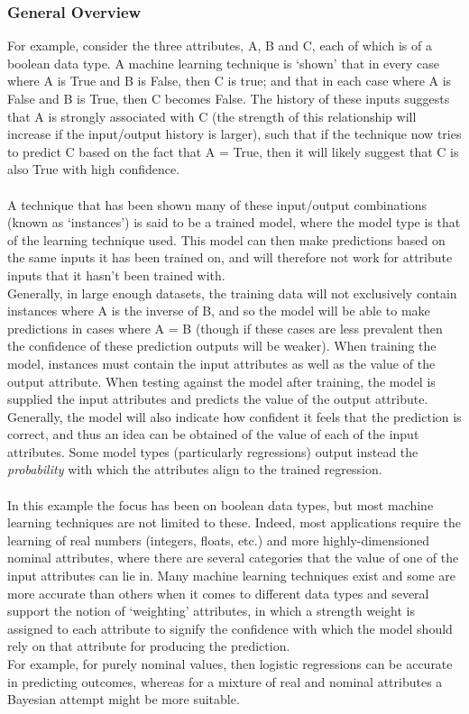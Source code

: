 \subsubsection{General Overview}
For example, consider the three attributes, A, B and C, each of which is of a boolean data type. A machine learning technique is `shown' that in every case where A is True and B is False, then C is true; and that in each case where A is False and B is True, then C becomes False. The history of these inputs suggests that A is strongly associated with C (the strength of this relationship will increase if the input/output history is larger), such that if the technique now tries to predict C based on the fact that A = True, then it will likely suggest that C is also True with high confidence.
\\ \\
A technique that has been shown many of these input/output combinations (known as `instances') is said to be a trained model, where the model type is that of the learning technique used. This model can then make predictions based on the same inputs it has been trained on, and will therefore not work for attribute inputs that it hasn't been trained with.
\\
Generally, in large enough datasets, the training data will not exclusively contain instances where A is the inverse of B, and so the model will be able to make predictions in cases where A = B (though if these cases are less prevalent then the confidence of these prediction outputs will be weaker). When training the model, instances must contain the input attributes as well as the value of the output attribute. When testing against the model after training, the model is supplied the input attributes and predicts the value of the output attribute. Generally, the model will also indicate how confident it feels that the prediction is correct, and thus an idea can be obtained of the value of each of the input attributes. Some model types (particularly regressions) output instead the \emph{probability} with which the attributes align to the trained regression.
\\ \\
In this example the focus has been on boolean data types, but most machine learning techniques are not limited to these. Indeed, most applications require the learning of real numbers (integers, floats, etc.) and more highly-dimensioned nominal attributes, where there are several categories that the value of one of the input attributes can lie in. Many machine learning techniques exist and some are more accurate than others when it comes to different data types and several support the notion of `weighting' attributes, in which a strength weight is assigned to each attribute to signify the confidence with which the model should rely on that attribute for producing the prediction.
\\
For example, for purely nominal values, then logistic regressions can be accurate in predicting outcomes, whereas for a mixture of real and nominal attributes a Bayesian attempt might be more suitable. 

